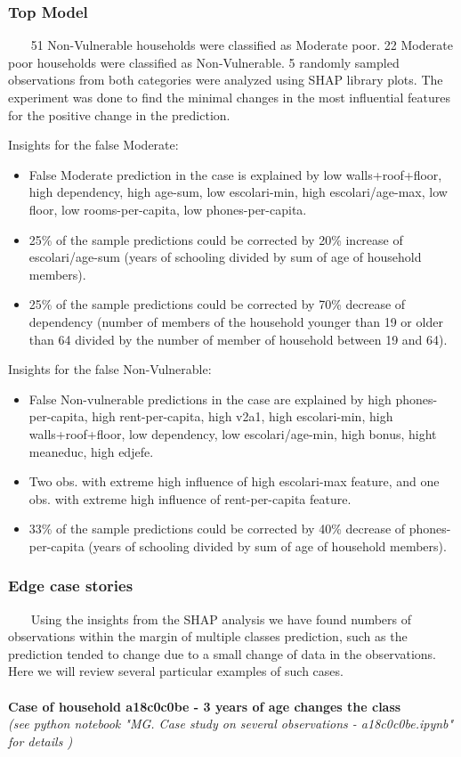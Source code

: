     \subsubsection{Top Model}~~~
        51 Non-Vulnerable households were classified as Moderate poor. 22 Moderate poor households were classified as Non-Vulnerable. 5 randomly sampled observations from both categories were analyzed using SHAP library plots. The experiment was done to find the minimal changes in the most influential features for the positive change in the prediction.
        
        Insights for the false Moderate:
        \begin{itemize}
            \item False Moderate prediction in the case is explained by low walls+roof+floor, high dependency, high age-sum, low escolari-min, high escolari/age-max, low floor, low rooms-per-capita, low phones-per-capita.
            \item 25\% of the sample predictions could be corrected by 20\% increase of escolari/age-sum (years of schooling divided by sum of age of household members). 
            \item 25\% of the sample predictions could be corrected by 70\% decrease of dependency (number of members of the household younger than 19 or older than 64 divided by the number of member of household between 19 and 64). 

        \end{itemize}
        Insights for the false Non-Vulnerable:
        \begin{itemize}
            \item False Non-vulnerable predictions in the case are explained by high phones-per-capita, high rent-per-capita, high v2a1, high escolari-min, high walls+roof+floor, low dependency, low escolari/age-min, high bonus, hight meaneduc, high edjefe.
            \item Two obs. with extreme high influence of high escolari-max feature, and one obs. with extreme high influence of rent-per-capita feature.
            \item 33\% of the sample predictions could be corrected by 40\% decrease of phones-per-capita (years of schooling divided by sum of age of household members). 
        \end{itemize}

    \subsubsection{Edge case stories}~~~
    Using the insights from the SHAP analysis we have found numbers of observations within the margin of multiple classes prediction, such as the prediction tended to change due to a small change of data in the observations. Here we will review several particular examples of such cases.\\
    \\
\textbf{Case of household a18c0c0be - 3 years of age changes the class}\\
\textit{(see python notebook "MG. Case study on several observations - a18c0c0be.ipynb" for details \cite{our_github})}\\

